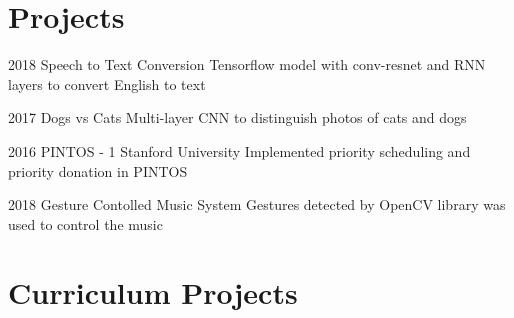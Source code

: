 \documentclass[print]{friggeri-cv} %
\begin{document}



\section{Projects}

\begin{entrylist}




\entry
{2018}
{Speech to Text Conversion}
{}
{Tensorflow model with conv-resnet and RNN layers to convert English to text}
{}

\entry
{2017}
{Dogs vs Cats}
{}
{Multi-layer CNN to distinguish photos of cats and dogs}
{}


\entry
{2016}
{PINTOS - 1}
{Stanford University}
{Implemented priority scheduling and priority donation in PINTOS }
{}


\entry
{2018}
{Gesture Contolled Music System}
{}
{Gestures detected by OpenCV library was used to control the music }
{}




\end{entrylist}




\section{Curriculum Projects}
\end{document}
